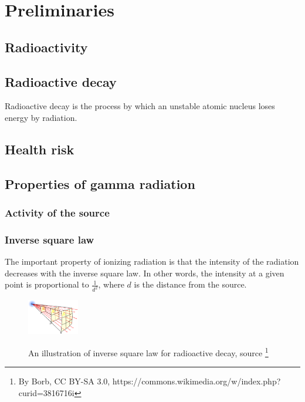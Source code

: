 
\chapter{Preliminaries\label{chap:preliminaries}}

\section{Radioactivity}


\section{Radioactive decay}
Radioactive decay is the process by which an unstable atomic nucleus loses energy by radiation. 


\section{Health risk}


\section{Properties of gamma radiation}
  \subsection{Activity of the source}
  \subsection{Inverse square law}%
The important property of ionizing radiation is that the intensity of the radiation decreases with the inverse square law.
In other words, the intensity at a given point is proportional to $\frac{1}{d^{2}}$, where $d$ is the distance from the source.
  \begin{figure}[!h]
    \centering
      \includegraphics[width=0.2\textwidth]{./fig/photos/Inverse_square_law.eps}
      \label{fig:isl}
    \caption{An illustration of inverse square law for radioactive decay, source \protect \footnote{By Borb, CC BY-SA 3.0, https://commons.wikimedia.org/w/index.php?curid=3816716i}}
  \end{figure}


